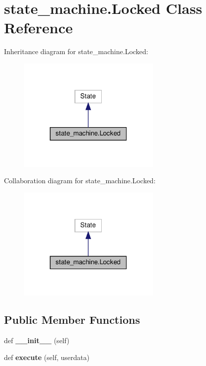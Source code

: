 \hypertarget{classstate__machine_1_1Locked}{}\section{state\+\_\+machine.\+Locked Class Reference}
\label{classstate__machine_1_1Locked}


Inheritance diagram for state\+\_\+machine.\+Locked\+:
\nopagebreak
\begin{figure}[H]
\begin{center}
\leavevmode
\includegraphics[width=195pt]{classstate__machine_1_1Locked__inherit__graph}
\end{center}
\end{figure}


Collaboration diagram for state\+\_\+machine.\+Locked\+:
\nopagebreak
\begin{figure}[H]
\begin{center}
\leavevmode
\includegraphics[width=195pt]{classstate__machine_1_1Locked__coll__graph}
\end{center}
\end{figure}
\subsection*{Public Member Functions}
\begin{DoxyCompactItemize}
\item 
\mbox{\label{classstate__machine_1_1Locked_a9b4ed5583dd109a846e88c4ee296dd6a}} 
def {\bfseries \+\_\+\+\_\+init\+\_\+\+\_\+} (self)
\item 
\mbox{\label{classstate__machine_1_1Locked_a9a53fcb4569ca96d6f72d256b112ad5b}} 
def {\bfseries execute} (self, userdata)
\end{DoxyCompactItemize}
